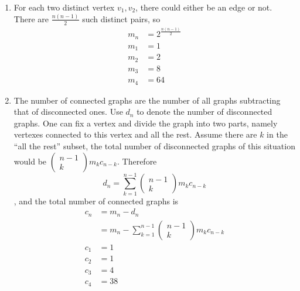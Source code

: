 \documentclass{homework}
\begin{document}
\begin{problem}{3}
\begin{enumerate}
\item For each two distinct vertex $v_1, v_2$, there could either be an edge
or not. There are $\frac{n(n-1)}{2}$ such distinct pairs, so
\begin{align*}
m_n &= 2^\frac{n(n-1)}{2}\\
m_1 &= 1\\
m_2 &= 2\\
m_3 &= 8\\
m_4 &= 64
\end{align*}

\item
The number of connected graphs are the number of all graphs subtracting
that of disconnected ones. Use $d_n$ to denote the number of disconnected
graphs. One can fix a vertex and divide the graph into two parts, namely
vertexes connected to this vertex and all the rest. Assume there are $k$
in the ``all the rest'' subset, the total number of disconnected graphs
of this situation would be
$\begin{pmatrix}n-1\\k\end{pmatrix}m_k c_{n-k}$. Therefore
$$d_n = \sum^{n-1}_{k=1}\begin{pmatrix}n-1\\k\end{pmatrix}m_k c_{n-k}$$
, and the total number of connected graphs is
\begin{align*}
c_n &= m_n - d_n \\
    &= m_n - \sum^{n-1}_{k=1}\begin{pmatrix}n-1\\k\end{pmatrix}m_k c_{n-k}\\
c_1 &= 1\\
c_2 &= 1\\
c_3 &= 4\\
c_4 &= 38
\end{align*}
\end{enumerate}
\end{problem}
\end{document}
